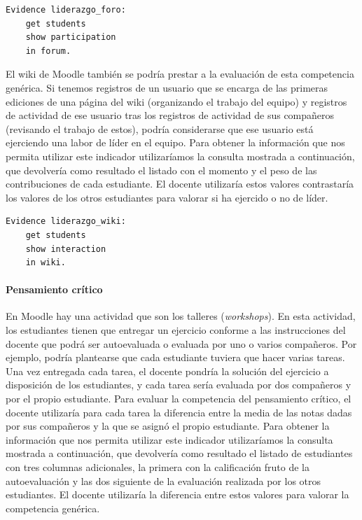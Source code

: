 \begin{verbatim}
Evidence liderazgo_foro: 
	get students
	show participation
	in forum.
\end{verbatim}

				El wiki de Moodle también se podría prestar a la evaluación de esta competencia genérica. Si tenemos registros de un usuario que se encarga de las primeras ediciones de una página del wiki (organizando el trabajo del equipo) y registros de actividad de ese usuario tras los registros de actividad de sus compañeros (revisando el trabajo de estos), podría considerarse que ese usuario está ejerciendo una labor de líder en el equipo. Para obtener la información que nos permita utilizar este indicador utilizaríamos la consulta mostrada a continuación, que devolvería como resultado el listado con el momento y el peso de las contribuciones de cada estudiante. El docente utilizaría estos valores contrastaría los valores de los otros estudiantes para valorar si ha ejercido o no de líder.

\begin{verbatim}
Evidence liderazgo_wiki: 
	get students 
	show interaction 
	in wiki.
\end{verbatim}

				\paragraph*{Pensamiento crítico}
				En Moodle hay una actividad que son los talleres (\emph{workshops}). En esta actividad, los estudiantes tienen que entregar un ejercicio conforme a las instrucciones del docente que podrá ser autoevaluada o evaluada por uno o varios compañeros. Por ejemplo, podría plantearse que cada estudiante tuviera que hacer varias tareas. Una vez entregada cada tarea, el docente pondría la solución del ejercicio a disposición de los estudiantes, y cada tarea sería evaluada por dos compañeros y por el propio estudiante. Para evaluar la competencia del pensamiento crítico, el docente utilizaría para cada tarea la diferencia entre la media de las notas dadas por sus compañeros y la que se asignó el propio estudiante. Para obtener la información que nos permita utilizar este indicador utilizaríamos la consulta mostrada a continuación, que devolvería como resultado el listado de estudiantes con tres columnas adicionales, la primera con la calificación fruto de la autoevaluación y las dos siguiente de la evaluación realizada por los otros estudiantes. El docente utilizaría la diferencia entre estos valores para valorar la competencia genérica.

